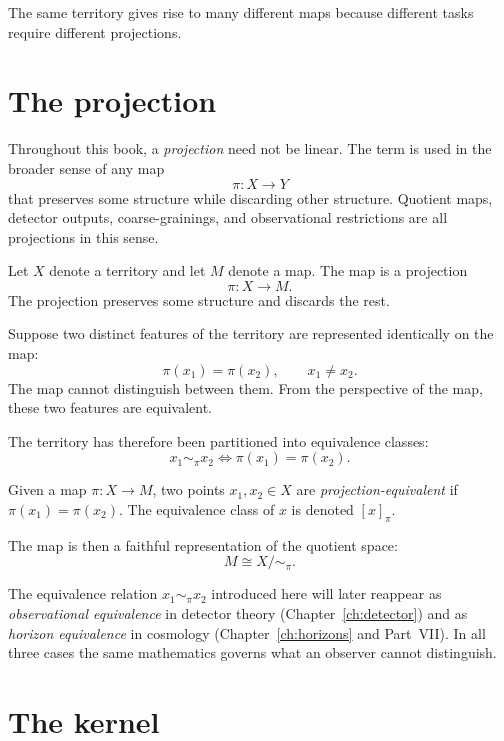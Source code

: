 The same territory gives rise to many different maps because
different tasks require different projections.

\section{The projection}

\begin{TechNote}[Projection]
  Throughout this book, a \emph{projection} need not be linear.
  The term is used in the broader sense of any map
  \[
    \pi : X \to Y
  \]
  that preserves some structure while discarding other structure.
  Quotient maps, detector outputs, coarse-grainings, and
  observational restrictions are all projections in this sense.
\end{TechNote}

Let $X$ denote a territory and let $M$ denote a map.
The map is a projection
\[
  \pi : X \to M.
\]
The projection preserves some structure and discards the rest.

Suppose two distinct features of the territory are represented
identically on the map:
\[
  \pi(x_1) = \pi(x_2), \qquad x_1 \neq x_2.
\]
The map cannot distinguish between them.
From the perspective of the map, these two features are equivalent.

The territory has therefore been partitioned into equivalence classes:
\[
  x_1 \sim_\pi x_2
  \iff
  \pi(x_1) = \pi(x_2).
\]

\begin{definition}
  \label{def:proj-equiv}
  Given a map $\pi : X \to M$, two points $x_1, x_2 \in X$ are
  \emph{projection-equivalent} if $\pi(x_1) = \pi(x_2)$.
  The equivalence class of $x$ is denoted $[x]_\pi$.
\end{definition}

The map is then a faithful representation of the quotient space:
\[
  M \cong X / {\sim_\pi}.
\]

\begin{ForwardRef}
  The equivalence relation $x_1 \sim_\pi x_2$ introduced here
  will later reappear as \emph{observational equivalence} in
  detector theory (Chapter~\ref{ch:detector}) and as
  \emph{horizon equivalence} in cosmology
  (Chapter~\ref{ch:horizons} and Part~VII).
  In all three cases the same mathematics governs what an
  observer cannot distinguish.
\end{ForwardRef}

\section{The kernel}

